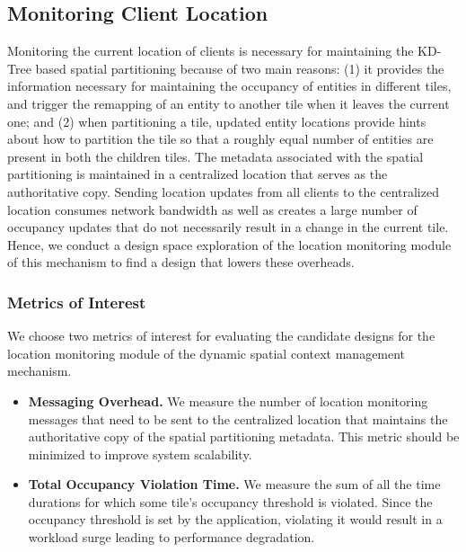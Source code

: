 \subsection{Monitoring Client Location}
Monitoring the current location of clients is necessary for maintaining the KD-Tree based spatial partitioning because of two main reasons: (1) it provides the information necessary for maintaining the occupancy of entities in different tiles, and trigger the remapping of an entity to another tile when it leaves the current one; and (2) when partitioning a tile, updated entity locations provide hints about how to partition the tile so that a roughly equal number of entities are present in both the children tiles.
The metadata associated with the spatial partitioning is maintained in a centralized location that serves as the authoritative copy. Sending location updates from all clients to the centralized location consumes network bandwidth as well as creates a large number of occupancy updates that do not necessarily result in a change in the current tile. Hence, we conduct a design space exploration of the location monitoring module of this mechanism to find a design that lowers these overheads.
\subsubsection{Metrics of Interest}
We choose two metrics of interest for evaluating the candidate designs for the location monitoring module of the dynamic spatial context management mechanism. 
\begin{itemize}
\item \textbf{Messaging Overhead. } We measure the number of location monitoring messages that need to be sent to the centralized location that maintains the authoritative copy of the spatial partitioning metadata. This metric should be minimized to improve system scalability. 
\item \textbf{Total Occupancy Violation Time. } We measure the sum of all the time durations for which some tile's occupancy threshold is violated. Since the occupancy threshold is set by the application, violating it would result in a workload surge leading to performance degradation.
\end{itemize}

